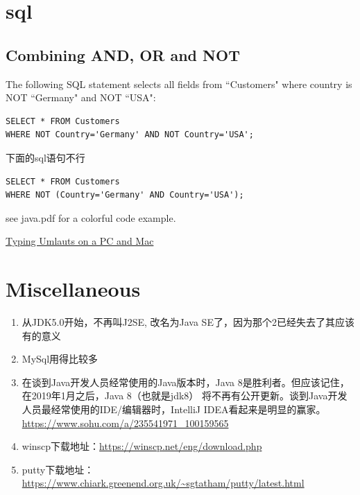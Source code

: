 \documentclass[a4paper, 12pt]{article}
\begin{document}
\section{sql}
\subsection{Combining AND, OR and NOT}
The following SQL statement selects all fields from ``Customers" where country is NOT ``Germany" and NOT ``USA":
\begin{verbatim}
SELECT * FROM Customers
WHERE NOT Country='Germany' AND NOT Country='USA';
\end{verbatim}

下面的sql语句不行
\begin{verbatim}
SELECT * FROM Customers 
WHERE NOT (Country='Germany' AND Country='USA');
\end{verbatim}

see java.pdf for a colorful code example.


\href{http://www.nthuleen.com/teach/misc/typingumlauts.html}{Typing Umlauts on a PC and Mac}


\section{Miscellaneous}

\begin{enumerate}
\item 从JDK5.0开始，不再叫J2SE, 改名为Java SE了，因为那个2已经失去了其应该有的意义

\item MySql用得比较多

\item 在谈到Java开发人员经常使用的Java版本时，Java 8是胜利者。但应该记住，在2019年1月之后，Java 8（也就是jdk8） 将不再有公开更新。谈到Java开发人员最经常使用的IDE/编辑器时，IntelliJ IDEA看起来是明显的赢家。 \url{https://www.sohu.com/a/235541971_100159565}

\item winscp下载地址：\url{https://winscp.net/eng/download.php}

\item putty下载地址：\url{https://www.chiark.greenend.org.uk/~sgtatham/putty/latest.html}

\end{enumerate}
\end{document}
